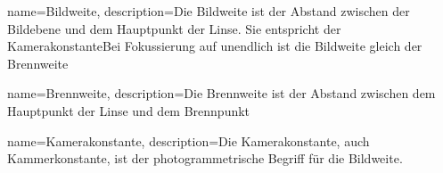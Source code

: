 {
    name=Bildweite,
    description={Die Bildweite ist der Abstand zwischen der Bildebene und dem Hauptpunkt der Linse. Sie entspricht der KamerakonstanteBei Fokussierung auf unendlich ist die Bildweite gleich der Brennweite}
}

{
    name=Brennweite,
    description={Die Brennweite ist der Abstand zwischen dem Hauptpunkt der Linse und dem Brennpunkt}
}

{
    name=Kamerakonstante,
    description={Die Kamerakonstante, auch Kammerkonstante, ist der photogrammetrische Begriff für die Bildweite.}
}

